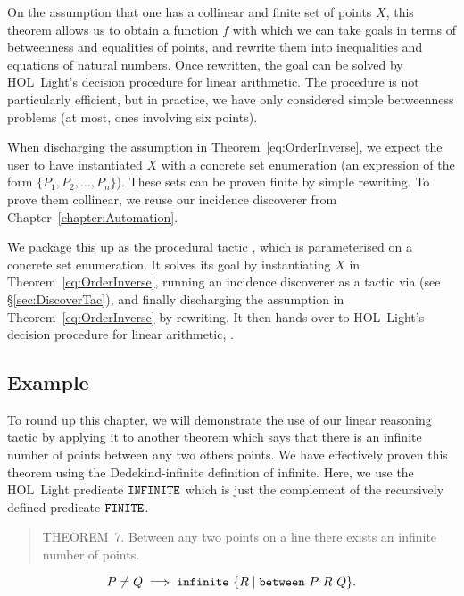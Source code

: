 On the assumption that one has a collinear and finite set of points $X$, this theorem allows us to obtain a function $f$ with which we can take goals in terms of betweenness and equalities of points, and rewrite them into inequalities and equations of natural numbers. Once rewritten, the goal can be solved by HOL~Light's decision procedure for linear arithmetic. The procedure is not particularly efficient, but in practice, we have only considered simple betweenness problems (at most, ones involving six points).

When discharging the assumption in Theorem~\ref{eq:OrderInverse}, we expect the user to have instantiated $X$ with a concrete set enumeration (an expression of the form $\{P_1,P_2,\ldots,P_n\}$). These sets can be proven finite by simple rewriting. To prove them collinear, we reuse our incidence discoverer from Chapter~\ref{chapter:Automation}.

We package this up as the procedural tactic , which is parameterised on a concrete set enumeration. It solves its goal by instantiating $X$ in Theorem~\ref{eq:OrderInverse}, running an incidence discoverer as a tactic via  (see \S\ref{sec:DiscoverTac}), and finally discharging the assumption in Theorem~\ref{eq:OrderInverse} by rewriting. It then hands over to HOL~Light's decision procedure for linear arithmetic, .

\subsection{Example}
To round up this chapter, we will demonstrate the use of our linear reasoning tactic  by applying it to another theorem which says that there is an infinite number of points between any two others points. We have effectively proven this theorem using the Dedekind-infinite definition of infinite. Here, we use the HOL~Light predicate $\texttt{INFINITE}$ which is just the complement of the recursively defined predicate $\texttt{FINITE}$.

\begin{quotation}THEOREM~7. Between any two points on a line there exists an infinite number of points.
\end{quotation}
\begin{equation*}
P\neq Q \implies \texttt{infinite}\ \{R\; \vert\; \texttt{between}\ P\ R\ Q\}.
\end{equation*}

